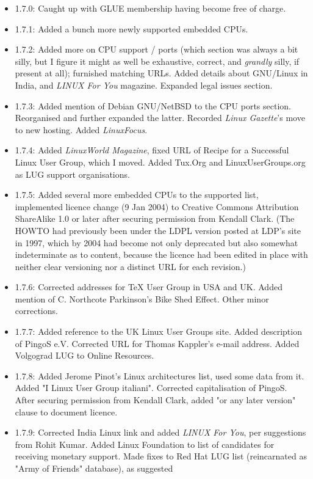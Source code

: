 \begin{itemize}
\item 1.7.0: Caught up with GLUE membership having become free
of charge.
\item 1.7.1: Added a bunch more newly supported embedded CPUs.
\item 1.7.2: Added more on CPU support / ports (which section was always a bit silly, but I figure it might as well be exhaustive, correct, and {\itshape grandly\/} silly, if present at all); furnished matching URLs.  Added details about GNU/Linux in India, and {\itshape LINUX For You\/} magazine.  Expanded legal issues section.
\item 1.7.3: Added mention of Debian GNU/NetBSD to the CPU ports 
section.  Reorganised and further expanded the latter.  Recorded {\itshape Linux
Gazette\/}'s move to new hosting.  Added {\itshape LinuxFocus\/}.
\item 1.7.4: Added {\itshape LinuxWorld Magazine\/}, fixed URL of Recipe for
a Successful Linux User Group, which I moved.  Added Tux.Org and 
LinuxUserGroups.org as LUG support organisations.
\item 1.7.5: Added several more embedded CPUs to the supported list, implemented licence change (9 Jan 2004) to Creative Commons Attribution ShareAlike 1.0 or later after securing permission from Kendall Clark. (The HOWTO had previously been under the LDPL version posted at LDP's site in 1997, which by 2004 had become not only deprecated but also somewhat indeterminate as to content, because the licence had been edited in place with neither clear versioning nor a distinct URL for each revision.)
\item 1.7.6: Corrected addresses for TeX User Group in USA and
UK.  Added mention of C. Northcote Parkinson's Bike Shed Effect.  Other 
minor corrections.
\item 1.7.7: Added reference to the UK Linux User Groups site.
Added description of PingoS e.V.  Corrected URL for Thomas Kappler's 
e-mail address.  Added Volgograd LUG to Online Resources.
\item 1.7.8: Added Jerome Pinot's Linux architectures list,
used some data from it.  Added "I Linux User Group italiani".  
Corrected capitalisation of PingoS.  After securing permission from
Kendall Clark, added "or any later version" clause to document licence.
\item 1.7.9: Corrected India Linux link and added 
{\itshape LINUX For You\/}, per suggestions from Rohit Kumar.  Added Linux 
Foundation to list of candidates for receiving monetary support.  Made fixes 
to Red Hat LUG list (reincarnated as "Army of Friends" database), as suggested 

\end{itemize}
